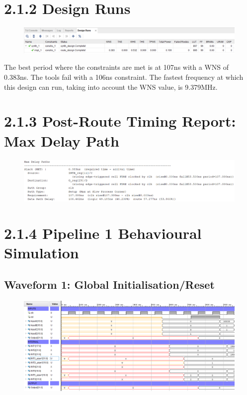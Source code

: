 \documentclass[11pt]{report}
\begin{document}
\section*{2.1.2 Design Runs}
\begin{figure}[H]
    \includegraphics[width=\columnwidth]{Reports/Lab3/Assets/2.1.2_design-runs.png}
\end{figure}
The best period where the constraints are met is at 107ns with a WNS of 0.383ns. The tools fail with a 106ns constraint. The fastest frequency at which this design can run, taking into account the WNS value, is 9.379MHz.


\section*{2.1.3 Post-Route Timing Report: Max Delay Path}
\begin{figure}[H]
    \includegraphics[width=\columnwidth]{Reports/Lab3/Assets/2.1.3_max-delay-path.png}
\end{figure}

\section*{2.1.4 Pipeline 1 Behavioural Simulation}
\subsection*{Waveform 1: Global Initialisation/Reset}
\begin{figure}[H]
    \includegraphics[width=\columnwidth]{Reports/Lab3/Assets/2.1.4_waveform-initial-reset.png}
\end{figure}
\end{document}

